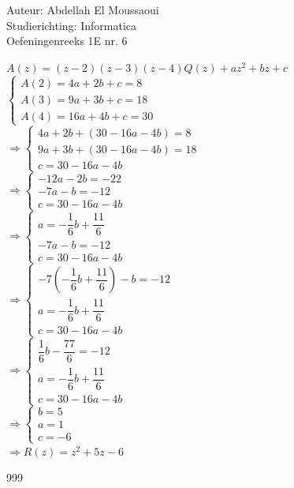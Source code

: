 \documentclass[a4paper]{article}
\begin{document}
  
\noindent \large Auteur: Abdellah El Moussaoui \\
\noindent \large Studierichting: Informatica\\
\noindent \large Oefeningenreeks 1E nr. 6\\

\medskip

\normalsize

\medskip

$A(z) = (z - 2)(z - 3)(z-4)Q(z) + az^2 + bz+c$\\


$\left\{
\begin{array}{l}
A(2)=4a+2b+c=8\\
A(3)=9a+3b+c=18\\
A(4)=16a+4b+c=30
\end{array}
\right.$\\

$\Rightarrow
\left\{
\begin{array}{l}
4a+2b+\left(30-16a-4b\right)=8\\
9a+3b+\left(30-16a-4b\right)=18\\
c=30-16a-4b
\end{array}
\right.$\\

$\Rightarrow
\left\{
\begin{array}{l}
-12a-2b=-22\\
-7a-b=-12\\
c=30-16a-4b
\end{array}
\right.$\\

$\Rightarrow
\left\{
\begin{array}{l}
a=-\dfrac16 b+\dfrac{11}{6}\\
-7a-b=-12\\
c=30-16a-4b
\end{array}
\right.$\\

$\Rightarrow
\left\{
\begin{array}{l}
-7\left(-\dfrac16 b+\dfrac{11}{6}\right)-b=-12\\
a=-\dfrac16 b+\dfrac{11}{6}\\
c=30-16a-4b
\end{array}
\right.$\\

$\Rightarrow
\left\{
\begin{array}{l}
\dfrac16 b-\dfrac{77}{6}=-12\\
a=-\dfrac16 b+\dfrac{11}{6}\\
c=30-16a-4b
\end{array}
\right.$\\

$\Rightarrow
\left\{
\begin{array}{l}
b=5\\
a=1\\
c=-6
\end{array}
\right.$\\

$\Rightarrow R(z)=z^2+5z-6$\\


\begin{thebibliography}{999}
\end{thebibliography}
\end{document}
